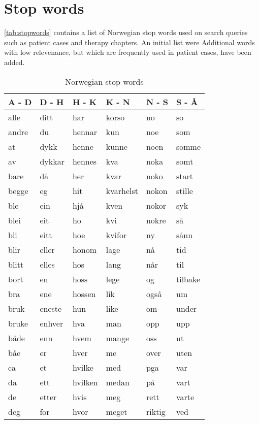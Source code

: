 
\chapter{Stop words}
\autoref{tab:stopwords} contains a list of Norwegian stop words used on search
queries such as patient cases and therapy chapters.
An initial list were %
Additional words with low relevenance, but which are frequently used in
patient cases, have been added.

\begin{table}[htbp] \footnotesize \center
\caption{Norwegian stop words\label{tab:stopwords}}
\begin{tabular}{l l l l l l}
    \toprule
    A - D & D - H & H - K & K - N & N - S & S - Å \\
    \midrule
    alle & ditt & har & korso & no & so \\
    andre & du & hennar & kun & noe & som \\
    at & dykk & henne & kunne & noen & somme \\
    av & dykkar & hennes & kva & noka & somt \\
    bare & då & her & kvar & noko & start \\
    begge & eg & hit & kvarhelst & nokon & stille \\
    ble & ein & hjå & kven & nokor & syk \\
    blei & eit & ho & kvi & nokre & så \\
    bli & eitt & hoe & kvifor & ny & sånn \\
    blir & eller & honom & lage & nå & tid \\
    blitt & elles & hos & lang & når & til \\
    bort & en & hoss & lege & og & tilbake \\
    bra & ene & hossen & lik & også & um \\
    bruk & eneste & hun & like & om & under \\
    bruke & enhver & hva & man & opp & upp \\
    både & enn & hvem & mange & oss & ut \\
    båe & er & hver & me & over & uten \\
    ca & et & hvilke & med & pga & var \\
    da & ett & hvilken & medan & på & vart \\
    de & etter & hvis & meg & rett & varte \\
    deg & for & hvor & meget & riktig & ved \\

\end{tabular}
\end{table}
